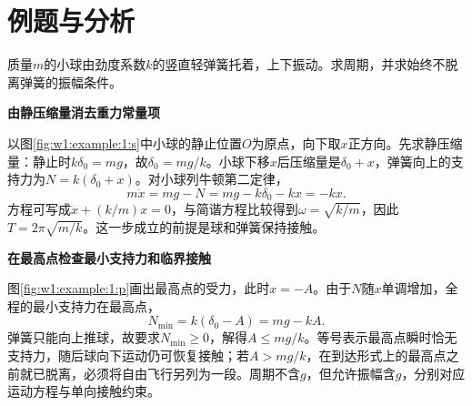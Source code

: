 \section{例题与分析}

\begin{question}\begin{example}[竖直弹簧上的小球]\label{w1:example:1}
质量$m$的小球由劲度系数$k$的竖直轻弹簧托着，上下振动。求周期，并求始终不脱离弹簧的振幅条件。
\end{example}
\end{question}
\begin{solution}\textbf{由静压缩量消去重力常量项}\par\nobreak
以图\ref{fig:w1:example:1:s}中小球的静止位置$O$为原点，向下取$x$正方向。先求静压缩量：静止时$k\delta_0=mg$，故$\delta_0=mg/k$。小球下移$x$后压缩量是$\delta_0+x$，弹簧向上的支持力为$N=k(\delta_0+x)$。对小球列牛顿第二定律，
\[
m\ddot x=mg-N=mg-k\delta_0-kx=-kx.
\]
方程可写成$\ddot x+(k/m)x=0$，与简谐方程比较得到$\omega=\sqrt{k/m}$，因此$T=2\pi\sqrt{m/k}$。这一步成立的前提是球和弹簧保持接触。



\par\medskip{}\noindent\textbf{在最高点检查最小支持力和临界接触}\par\nobreak
图\ref{fig:w1:example:1:p}画出最高点的受力，此时$x=-A$。由于$N$随$x$单调增加，全程的最小支持力在最高点，
\[
N_{\min}=k(\delta_0-A)=mg-kA.
\]
弹簧只能向上推球，故要求$N_{\min}\ge0$，解得$A\le mg/k$。等号表示最高点瞬时恰无支持力，随后球向下运动仍可恢复接触；若$A>mg/k$，在到达形式上的最高点之前就已脱离，必须将自由飞行另列为一段。周期不含$g$，但允许振幅含$g$，分别对应运动方程与单向接触约束。\end{solution}
